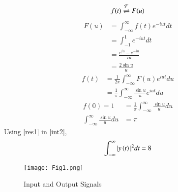 \documentclass[journal,12pt,twocolumn]{IEEEtran}
\begin{document}
\begin{align}
    f(t) \overset{\mathcal{F}}{ \rightleftharpoons}{F(u)}
\end{align}
\begin{align}
    F(u) &= \int_{-\infty}^{\infty} f(t)e^{-iut}dt\\
    &= \int_{-1}^{1}e^{-iut}dt\\
    &= \frac{e^{iu} - e^{-iu}}{iu}\\
    &= \frac{2\sin{u}}{u}
\end{align}
\begin{align}
    f(t) &= \frac{1}{2\pi}\int_{-\infty}^{\infty} F(u)e^{iut}du\\
    &= \frac{1}{\pi}\int_{-\infty}^{\infty} \frac{\sin u}{u}e^{iut}du
\end{align}
\begin{align}
    f(0) = 1 &= \frac{1}{\pi}\int_{-\infty}^{\infty} \frac{\sin u}{u}du\\
    \int_{-\infty}^{\infty} \frac{\sin u}{u}du &= \pi \label{res1}
\end{align}
Using \eqref{res1} in \eqref{int2},
\begin{align}
    \int_{-\infty}^{\infty} |y\left(t\right)|^2 dt = 8
\end{align}
\begin{figure}[htp]
    \centering
    \texttt{[image: Fig1.png]}
    \caption{Input and Output Signals}
    \label{fig:plot}
\end{figure}
\end{document}
